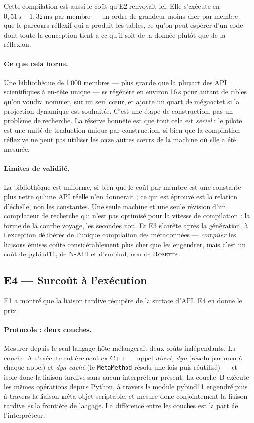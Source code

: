 \documentclass[11pt,a4paper]{article}
\newcommand{\rosetta}{\textsc{Rosetta}}
\newcommand{\code}[1]{\texttt{\small #1}}
\begin{document}
Cette compilation est aussi le coût qu'E2 renvoyait ici. Elle s'exécute en
$0{,}51\,\text{s} + 1{,}32\,\text{ms}$ par membre --- un ordre de grandeur moins
cher par membre que le parcours réflexif qui a produit les tables, ce qu'on peut
espérer d'un code dont toute la conception tient à ce qu'il soit de la donnée
plutôt que de la réflexion.

\paragraph{Ce que cela borne.} Une bibliothèque de 1\,000 membres --- plus grande
que la plupart des API scientifiques à en-tête unique --- se régénère en environ
16\,s pour autant de cibles qu'on voudra nommer, sur un seul cœur, et ajoute un
quart de mégaoctet si la projection dynamique est souhaitée. C'est une étape de
construction, pas un problème de recherche. La réserve honnête est que tout cela
est \emph{sériel} : le pilote est une unité de traduction unique par
construction, si bien que la compilation réflexive ne peut pas utiliser les onze
autres cœurs de la machine où elle a été mesurée.

\paragraph{Limites de validité.} La bibliothèque est uniforme, si bien que le coût
par membre est une constante plus nette qu'une API réelle n'en donnerait ; ce qui
est éprouvé est la relation d'échelle, non les constantes. Une seule machine et
une seule révision d'un compilateur de recherche qui n'est pas optimisé pour la
vitesse de compilation : la forme de la courbe voyage, les secondes non. Et E3
s'arrête après la génération, à l'exception délibérée de l'unique compilation des
métadonnées --- \emph{compiler} les liaisons émises coûte considérablement plus
cher que les engendrer, mais c'est un coût de pybind11, de N-API et d'embind,
non de \rosetta.

\subsection{E4 --- Surcoût à l'exécution}
\label{sec:e4}

E1 a montré que la liaison tardive récupère de la surface d'API. E4 en donne le
prix.

\paragraph{Protocole : deux couches.} Mesurer depuis le seul langage hôte
mélangerait deux coûts indépendants. La couche~A s'exécute entièrement en C++ ---
appel \emph{direct}, \emph{dyn} (résolu par nom à chaque appel) et
\emph{dyn-caché} (le \code{MetaMethod} résolu une fois puis réutilisé) --- et
isole donc la liaison tardive sans aucun interpréteur présent. La couche~B
exécute les mêmes opérations depuis Python, à travers le module pybind11 engendré
puis à travers la liaison méta-objet scriptable, et mesure donc conjointement la
liaison tardive \emph{et} la frontière de langage. La différence entre les
couches est la part de l'interpréteur.
\end{document}
